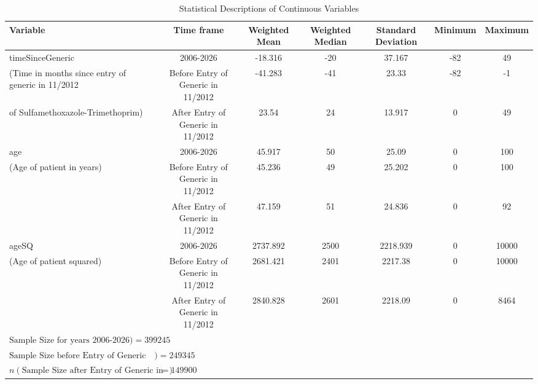\begin{table}[htbp]\centering
\def\sym#1{\ifmmode^{#1}\else\(^{#1}\)\fi}
\caption{Statistical Descriptions of Continuous Variables\label{tab1}}
\begin{tabular}{l*{6}{c}}
\hline\hline
            Variable&\multicolumn{1}{c}{Time frame}&\multicolumn{1}{c}{Weighted Mean}&\multicolumn{1}{c}{Weighted Median}&\multicolumn{1}{c}{Standard Deviation}&\multicolumn{1}{c}{Minimum}&\multicolumn{1}{c}{Maximum}\\
\hline
timeSinceGeneric                    &     2006-2026&             -18.316&    -20&   37.167&     -82&  49\\
(Time in months since entry of generic in 11/2012 &     Before Entry of Generic in 11/2012&     -41.283&    -41&    23.33 &     -82&  -1\\
of Sulfamethoxazole-Trimethoprim)   &     After Entry of Generic in 11/2012&       23.54 &    24&      13.917&     0&  49\\
[1em]
age                                 &     2006-2026&             45.917&    50&    25.09 &     0&  100\\
(Age of patient in years)           &     Before Entry of Generic in 11/2012&     45.236&    49&    25.202&     0&  100\\
                                    &     After Entry of Generic in 11/2012&      47.159&    51&    24.836&     0&  92\\
[1em]
ageSQ                               &     2006-2026&             2737.892&    2500&  2218.939&     0&  10000\\
(Age of patient squared)   &     Before Entry of Generic in 11/2012&    2681.421&    2401&  2217.38 &     0&  10000\\
                                    &     After Entry of Generic in 11/2012&      2840.828&    2601&  2218.09 &     0&  8464\\
\hline
$\text{Sample Size for years 2006-2026}) = 399245$\\
$\text{Sample Size before Entry of Generic in 11/2012}) = 249345$\\
$n(\text{Sample Size after Entry of Generic in 11/2012}) = 149900$\\
\hline\hline

\end{tabular}
\label{tab:Table4.2}
\end{table}
